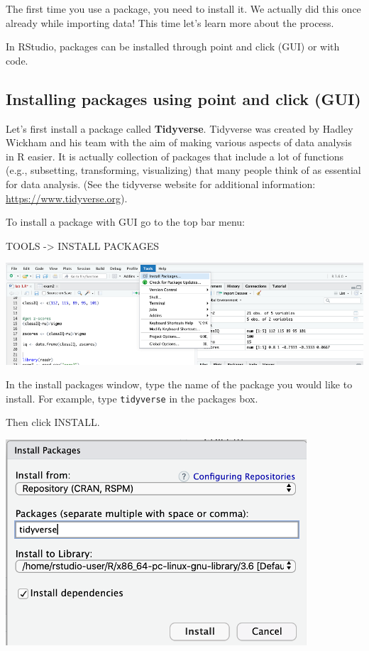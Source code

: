 \documentclass[
]{book}
\begin{document}
The first time you use a package, you need to install it. We actually did this once already while importing data! This time let's learn more about the process.

In RStudio, packages can be installed through point and click (GUI) or with code.

\hypertarget{installing-packages-using-point-and-click-gui}{%
\subsection{Installing packages using point and click (GUI)}\label{installing-packages-using-point-and-click-gui}}

Let's first install a package called \textbf{Tidyverse}. Tidyverse was created by Hadley Wickham and his team with the aim of making various aspects of data analysis in R easier. It is actually collection of packages that include a lot of functions (e.g., subsetting, transforming, visualizing) that many people think of as essential for data analysis. (See the tidyverse website for additional information: \url{https://www.tidyverse.org}).

To install a package with GUI go to the top bar menu:

TOOLS -\textgreater{} INSTALL PACKAGES

\includegraphics{img/instpacktools.png}

In the install packages window, type the name of the package you would like to install. For example, type \texttt{tidyverse} in the packages box.

Then click INSTALL.

\includegraphics{img/instpackguitidy.png}
\end{document}
